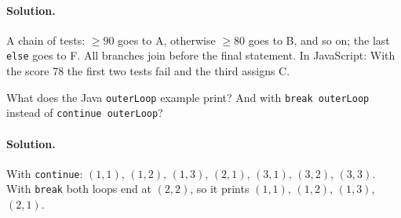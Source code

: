 \paragraph{Solution.} A chain of tests: $\ge 90$ goes to A, otherwise $\ge 80$ goes
to B, and so on; the last \texttt{else} goes to F. All branches join before the
final statement. In JavaScript:
With the score 78 the first two tests fail and the third assigns C.

\begin{exercise}
What does the Java \texttt{outerLoop} example print? And with \texttt{break
outerLoop} instead of \texttt{continue outerLoop}?
\end{exercise}

\paragraph{Solution.} With \texttt{continue}: $(1,1)$, $(1,2)$, $(1,3)$, $(2,1)$,
$(3,1)$, $(3,2)$, $(3,3)$. With \texttt{break} both loops end at $(2,2)$, so it
prints $(1,1)$, $(1,2)$, $(1,3)$, $(2,1)$.
